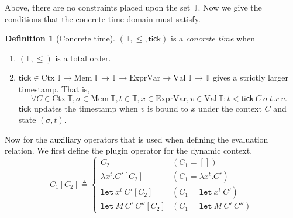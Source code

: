 \documentclass{article}
\theoremstyle{definition}
\newtheorem{definition}{Definition}[section]
\newcommand*{\ExprVar}{\text{ExprVar}}
\newcommand*{\Time}{\mathbb{T}}
\newcommand*{\Ctx}[1]{\text{Ctx}\:{#1}}
\newcommand*{\Value}[1]{\text{Val}\:{#1}}
\newcommand*{\Mem}[1]{\text{Mem}\:{#1}}
\newcommand*{\tick}{\mathsf{tick}}
\begin{document}
Above, there are no constraints placed upon the set $\Time$.
Now we give the conditions that the concrete time domain must satisfy.

\begin{definition}[Concrete time]
  $(\Time, \le, \tick)$ is a \emph{concrete time} when
  \begin{enumerate}
    \item $(\Time, \le)$ is a total order.
    \item $\tick\in\Ctx{\Time}\rightarrow\Mem{\Time}\rightarrow\Time\rightarrow\ExprVar\rightarrow\Value{\Time}\rightarrow\Time$ gives a strictly larger timestamp. That is,
          \[\forall C\in\Ctx{\Time}, \sigma\in\Mem{\Time},t\in\Time,x\in\ExprVar,v\in\Value{\Time}: t < \tick\:C\:\sigma\:t\:x\:v.\]
          $\tick$ updates the timestamp when $v$ is bound to $x$ under the context $C$ and state $(\sigma, t)$.
  \end{enumerate}
\end{definition}

Now for the auxiliary operators that is used when defining the evaluation relation.
We first define the plugin operator for the dynamic context.
\[
  C_{1}[C_{2}]\triangleq
  \begin{cases}
    C_{2}                           & (C_{1}=[])                       \\
    \lambda x^{t}.C'[C_{2}]         & (C_{1}=\lambda x^{t}.C')         \\
    \mathtt{let}\:x^{t}\:C'[C_{2}]  & (C_{1}=\mathtt{let}\:x^{t}\:C')  \\
    \mathtt{let}\:M\:C'\:C''[C_{2}] & (C_{1}=\mathtt{let}\:M\:C'\:C'')
  \end{cases}
\]
\end{document}
